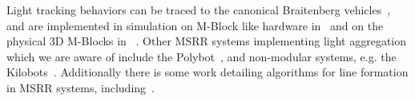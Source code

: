 Light tracking behaviors can be traced to the canonical Braitenberg vehicles~\cite{braitenberg1986vehicles}, and are implemented in simulation on M-Block like hardware in~\cite{sclaicithesis2016} and on the physical 3D M-Blocks in ~\cite{claici2017distributed}. Other MSRR systems implementing light aggregation which we are aware of include the Polybot~\cite{Yim-IROS07}, and non-modular systems, e.g. the Kilobots~\cite{Rubenstein-ICRA12}. Additionally there is some work detailing algorithms for line formation in MSRR systems, including~\cite{sung2015reconfiguration}.


%
